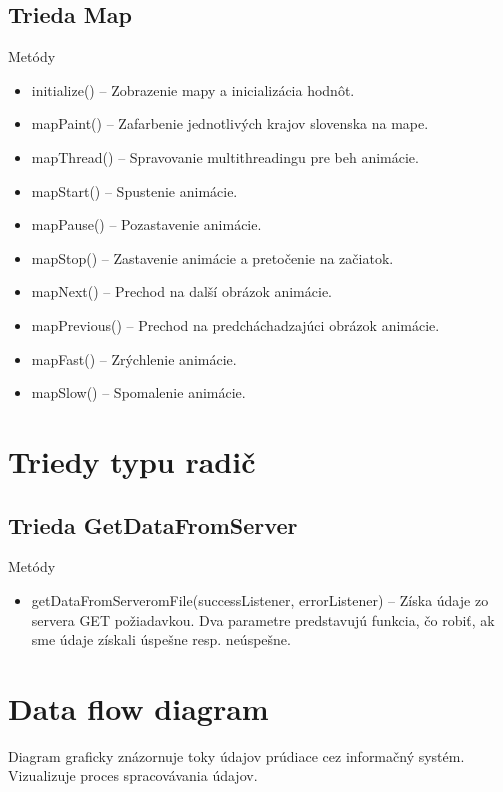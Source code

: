 \documentclass[12pt,a4paper]{report}
\begin{document}
\subsection[Trieda Map]{\rmfamily\bfseries
	Trieda Map}

Metódy
\begin{itemize}
	\item initialize() – Zobrazenie mapy a inicializácia hodnôt.
	\item mapPaint() – Zafarbenie jednotlivých krajov slovenska na mape.
	\item mapThread() – Spravovanie multithreadingu pre beh animácie.
	\item mapStart() – Spustenie animácie.
	\item mapPause() – Pozastavenie animácie.
	\item mapStop() – Zastavenie animácie a pretočenie na začiatok.
	\item mapNext() – Prechod na další obrázok animácie.
	\item mapPrevious() – Prechod na predcháchadzajúci obrázok animácie.
	\item mapFast() – Zrýchlenie animácie.
	\item mapSlow() – Spomalenie animácie.
\end{itemize}

\section[Triedy typu radič]{\rmfamily\bfseries
	Triedy typu radič}

\subsection[Trieda GetDataFromServer]{\rmfamily\bfseries
	Trieda GetDataFromServer}
Metódy
\begin{itemize}
	\item getDataFromServeromFile(successListener, errorListener) – Získa údaje zo servera GET požiadavkou. Dva parametre predstavujú funkcia, čo robiť, ak sme údaje získali úspešne resp. neúspešne.
\end{itemize}

\section[Data flow diagram]{\rmfamily\bfseries
	Data flow diagram}
	Diagram graficky znázornuje toky údajov prúdiace cez informačný systém. Vizualizuje proces spracovávania údajov.
	
\end{document}
